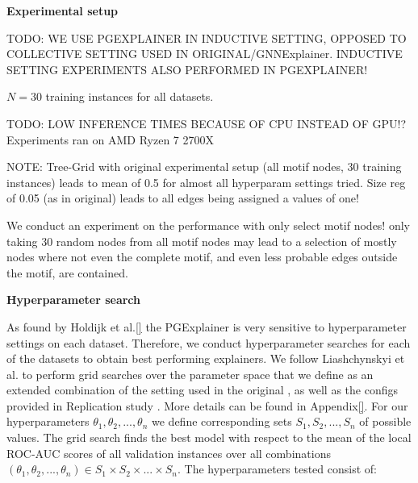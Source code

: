 \textbf{Experimental setup}


TODO: WE USE PGEXPLAINER IN INDUCTIVE SETTING, OPPOSED TO COLLECTIVE SETTING USED IN ORIGINAL/GNNExplainer. INDUCTIVE SETTING EXPERIMENTS ALSO PERFORMED IN PGEXPLAINER!

$N=30$ training instances for all datasets.

TODO: LOW INFERENCE TIMES BECAUSE OF CPU INSTEAD OF GPU!?
Experiments ran on AMD Ryzen 7 2700X


NOTE: Tree-Grid with original experimental setup (all motif nodes, 30 training instances) leads to mean of 0.5 for almost all hyperparam settings tried. Size reg of 0.05 (as in original) leads to all edges being assigned a values of one!

We conduct an experiment on the performance with only select motif nodes! only taking 30 random nodes from all motif nodes may lead to a selection of mostly nodes where not even the complete motif, and even less probable edges outside the motif, are contained.

\textbf{Hyperparameter search}

As found by Holdijk et al.\ref{} the PGExplainer is very sensitive to hyperparameter settings on each dataset. Therefore, we conduct hyperparameter searches for each of the datasets to obtain best performing explainers. We follow Liashchynskyi et al. \cite{liashchynskyi2019grid} to perform grid searches over the parameter space that we define as an extended combination of the setting used in the original \cite{}, as well as the configs provided in Replication study \cite{}. More details can be found in Appendix\ref{}. For our hyperparameters $\theta_1,\theta_2,...,\theta_n$ we define corresponding sets $S_1,S_2,...,S_n$ of possible values. The grid search finds the best model with respect to the mean of the local ROC-AUC scores of all validation instances over all combinations $(\theta_1,\theta_2,...,\theta_n) \in S_1\times S_2 \times...\times S_n$. The hyperparameters tested consist of: 




